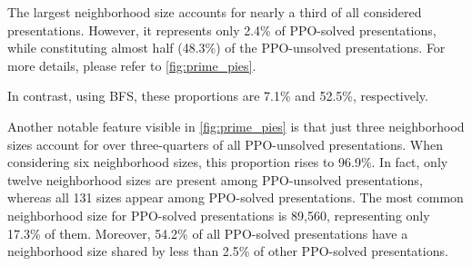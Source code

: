 The largest neighborhood size accounts for nearly a third of all considered presentations.
However, it represents only 2.4\% of PPO-solved presentations, while constituting almost half (48.3\%) of the PPO-unsolved presentations.
For more details, please refer to \autoref{fig:prime_pies}.

In contrast, using BFS, these proportions are 7.1\% and 52.5\%, respectively.

Another notable feature visible in \autoref{fig:prime_pies} is that just three neighborhood sizes account for over three-quarters of all PPO-unsolved presentations.
When considering six neighborhood sizes, this proportion rises to 96.9\%.
In fact, only twelve neighborhood sizes are present among PPO-unsolved presentations, whereas all 131 sizes appear among PPO-solved presentations.
The most common neighborhood size for PPO-solved presentations is 89,560, representing only 17.3\% of them.
Moreover, 54.2\% of all PPO-solved presentations have a neighborhood size shared by less than 2.5\% of other PPO-solved presentations.

